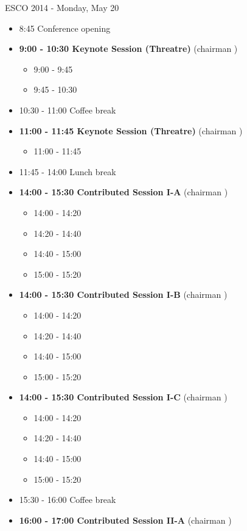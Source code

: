 \documentclass[10pt, A4]{article}
\begin{document}
\centerline{\huge ESCO 2014 - Monday, May 20}
\vspace{4mm}

\begin{itemize}    
  \item 8:45 Conference opening
  \item {\bf 9:00 - 10:30 Keynote Session (Threatre)} (chairman ) 
  \begin{itemize}
    \item 9:00 - 9:45
    \item 9:45 - 10:30 
  \end{itemize}
  \item 10:30 - 11:00 Coffee break
  \item {\bf 11:00 - 11:45 Keynote Session (Threatre)} (chairman ) 
  \begin{itemize}
    \item 11:00 - 11:45
  \end{itemize}
  \item 11:45 - 14:00 Lunch break      
  \item {\bf 14:00 - 15:30 Contributed Session I-A} (chairman ) 
  \begin{itemize}
    \item 14:00 - 14:20 
    \item 14:20 - 14:40 
    \item 14:40 - 15:00 
    \item 15:00 - 15:20 
  \end{itemize}
  \item {\bf 14:00 - 15:30 Contributed Session I-B} (chairman ) 
  \begin{itemize}
    \item 14:00 - 14:20 
    \item 14:20 - 14:40 
    \item 14:40 - 15:00 
    \item 15:00 - 15:20 
  \end{itemize}
    \item {\bf 14:00 - 15:30 Contributed Session I-C} (chairman ) 
  \begin{itemize}
    \item 14:00 - 14:20 
    \item 14:20 - 14:40 
    \item 14:40 - 15:00 
    \item 15:00 - 15:20 
  \end{itemize}
  \item 15:30 - 16:00 Coffee break
  \item {\bf 16:00 - 17:00 Contributed Session II-A} (chairman ) 

\end{itemize}
\end{document}
